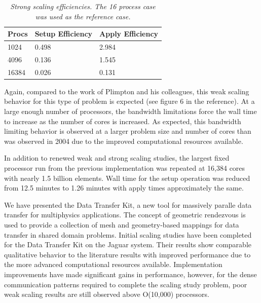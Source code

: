 \documentclass{mc2013}
\begin{document}
\begin{table}[htpb!]
  \begin{center}
    \begin{tabular}{lll}\hline\hline
      \multicolumn{1}{c}{Procs}& 
      \multicolumn{1}{c}{Setup Efficiency} & 
      \multicolumn{1}{c}{Apply Efficiency}\\\hline\hline
      1024 &	0.498 &	2.984 \\
      4096 &	0.136 &	1.545 \\
      16384 &	0.026 &	0.131 \\
      \hline\hline
    \end{tabular}
  \end{center}
  \caption{\sl Strong scaling efficiencies. The 16 process case was used
    as the reference case.}
  \label{tab:strong_efficiency}
\end{table}

Again, compared to the work of Plimpton and his colleagues, this weak
scaling behavior for this type of problem is expected (see figure 6 in
the reference).  At a large enough number of processors, the bandwidth
limitations force the wall time to increase as the number of cores is
increased. As expected, this bandwidth limiting behavior is observed
at a larger problem size and number of cores than was observed in 2004
due to the improved computational resources available.

In addition to renewed weak and strong scaling studies, the largest
fixed processor run from the previous implementation was repeated at
16,384 cores with nearly 1.5 billion elements. Wall time for the setup
operation was reduced from 12.5 minutes to 1.26 minutes with apply
times approximately the same.



We have presented the Data Transfer Kit, a new tool for massively
paralle data transfer for multiphysics applications. The concept of
geometric rendezvous is used to provide a collection of mesh and
geometry-based mappings for data transfer in shared domain problems.
Initial scaling studies have been completed for the Data Transfer Kit
on the Jaguar system. Their results show comparable qualitative
behavior to the literature results with improved performance due to
the more advanced computational resources available. Implementation
improvements have made significant gains in performance, however, for
the dense communication patterns required to complete the scaling
study problem, poor weak scaling results are still observed above
O(10,000) processors.
\end{document}
